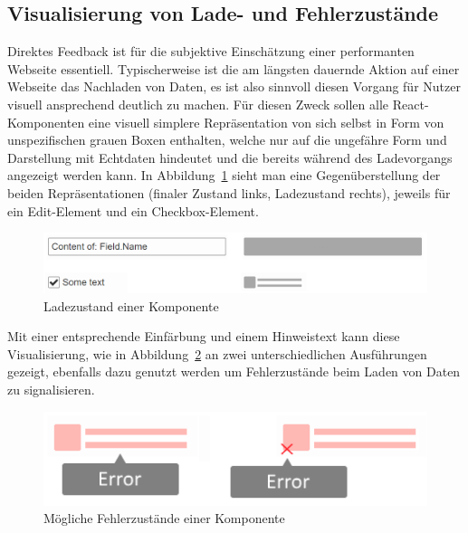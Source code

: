 \subsection{Visualisierung von Lade- und Fehlerzustände}\label{subsec:loading_state_section}
Direktes Feedback ist für die subjektive Einschätzung einer performanten Webseite essentiell. Typischerweise ist die am längsten dauernde Aktion auf einer Webseite das Nachladen von Daten, es ist also sinnvoll diesen Vorgang für Nutzer visuell ansprechend deutlich zu machen. Für diesen Zweck sollen alle React-Komponenten eine visuell simplere Repräsentation von sich selbst in Form von unspezifischen grauen Boxen enthalten, welche nur auf die ungefähre Form und Darstellung mit Echtdaten hindeutet und die bereits während des Ladevorgangs angezeigt werden kann. In Abbildung~\ref{fig:comp_loading_final_comparison} sieht man eine Gegenüberstellung der beiden Repräsentationen (finaler Zustand links, Ladezustand rechts), jeweils für ein Edit-Element und ein Checkbox-Element.

\begin{figure}
    \centering
    \captionsetup{justification=centering}
    \includegraphics[width=\textwidth]{figures/comp_loading_final_comparison.png}
        \caption{Ladezustand einer Komponente}\label{fig:comp_loading_final_comparison}
\end{figure}

Mit einer entsprechende Einfärbung und einem Hinweistext kann diese Visualisierung, wie in Abbildung~\ref{fig:comp_possible_error_state} an zwei unterschiedlichen Ausführungen gezeigt, ebenfalls dazu genutzt werden um Fehlerzustände beim Laden von Daten zu signalisieren.

\begin{figure}
    \centering
    \captionsetup{justification=centering}
    \includegraphics[width=\textwidth]{figures/comp_possible_error_state.png}
        \caption{Mögliche Fehlerzustände einer Komponente}\label{fig:comp_possible_error_state}
\end{figure}

